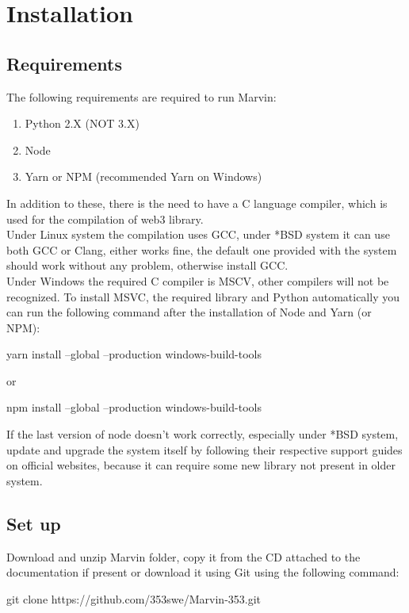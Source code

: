 \documentclass[ManualeSviluppatore.tex]{subfiles}
\begin{document}
\chapter{Installation}
\section{Requirements}
The following requirements are required to run Marvin:
\begin{enumerate}
	\item Python 2.X (NOT 3.X)
	\item Node
	\item Yarn or NPM (recommended Yarn on Windows)
\end{enumerate}
In addition to these, there is the need to have a C language compiler, which is used for the compilation of web3 library.\\

Under Linux system the compilation uses GCC, under *BSD system it can use both GCC or Clang, 	
either works fine, the default one provided with the system should work without any problem, otherwise install GCC. \\

Under Windows the required C compiler is MSCV, other compilers will not be recognized. To install MSVC, the required library and Python automatically you can run the following command after the installation of Node and Yarn (or NPM): \\
\begin{ttfamily}
yarn install --global --production windows-build-tools \\
\end{ttfamily}
or \\
\begin{ttfamily}
npm install --global --production windows-build-tools \\
\end{ttfamily}

If the last version of node doesn't work correctly, especially under *BSD system, update and upgrade the system itself by following their respective support guides on official websites, because it can require some new library not present in older system.

\section{Set up}
Download and unzip Marvin folder, copy it from the CD attached to the documentation if present or download it using Git using the following command: \\
\begin{ttfamily}
	git clone https://github.com/353swe/Marvin-353.git \\
\end{ttfamily}
\end{document}
